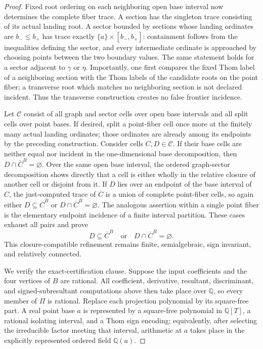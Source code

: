 \documentclass{article}
\begin{document}
\begin{proof}
Fixed root ordering on each neighboring open base interval now determines the complete fiber trace.  A section has the singleton trace consisting of its actual landing root.  A sector bounded by sections whose landing ordinates are \(b_-\leq b_+\) has trace exactly \(\{a\}\times[b_-,b_+]\): containment follows from the inequalities defining the sector, and every intermediate ordinate is approached by choosing points between the two boundary values.  The same statement holds for a sector adjacent to \(\gamma\) or \(\eta\).  Importantly, one first compares the fixed Thom label of a neighboring section with the Thom labels of the candidate roots on the point fiber; a transverse root which matches no neighboring section is not declared incident.  Thus the transverse construction creates no false frontier incidence.

Let \(\mathscr C\) consist of all graph and sector cells over open base intervals and all split cells over point bases.  If desired, split a point-fiber cell once more at the finitely many actual landing ordinates; those ordinates are already among its endpoints by the preceding construction.  Consider cells \(C,D\in\mathscr C\).  If their base cells are neither equal nor incident in the one-dimensional base decomposition, then \(D\cap\overline C^{B}=\varnothing\).  Over the same open base interval, the ordered graph-sector decomposition shows directly that a cell is either wholly in the relative closure of another cell or disjoint from it.  If \(D\) lies over an endpoint of the base interval of \(C\), the just-computed trace of \(C\) is a union of complete point-fiber cells, so again either \(D\subseteq\overline C^{B}\) or \(D\cap\overline C^{B}=\varnothing\).  The analogous assertion within a single point fiber is the elementary endpoint incidence of a finite interval partition.  These cases exhaust all pairs and prove
\[
D\subseteq\overline C^{B}
\quad\text{or}\quad
D\cap\overline C^{B}=\varnothing.
\]
This closure-compatible refinement remains finite, semialgebraic, sign invariant, and relatively connected.

We verify the exact-certification clause.  Suppose the input coefficients and the four vertices of \(B\) are rational.  All coefficient, derivative, resultant, discriminant, and signed-subresultant computations above then take place over \(\mathbb Q\), so every member of \(\Pi\) is rational.  Replace each projection polynomial by its square-free part.  A real point base \(a\) is represented by a square-free polynomial in \(\mathbb Q[T]\), a rational isolating interval, and a Thom sign encoding; equivalently, after selecting the irreducible factor meeting that interval, arithmetic at \(a\) takes place in the explicitly represented ordered field \(\mathbb Q(a)\).


\end{proof}
\end{document}
